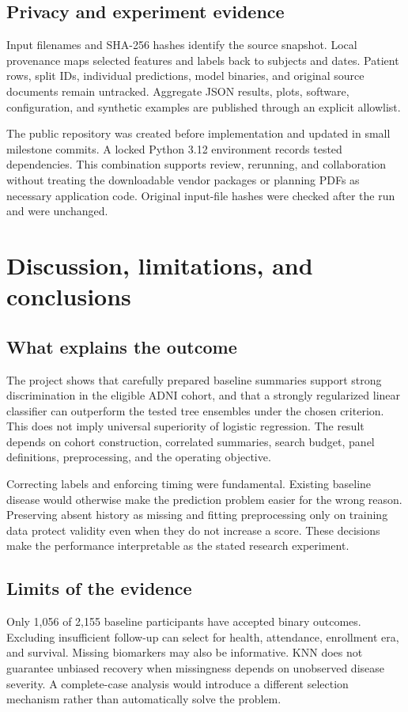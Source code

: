 \documentclass[11pt,a4paper]{article}
\begin{document}
\subsection{Privacy and experiment evidence}
Input filenames and SHA-256 hashes identify the source snapshot. Local provenance maps selected features and labels back to subjects and dates. Patient rows, split IDs, individual predictions, model binaries, and original source documents remain untracked. Aggregate JSON results, plots, software, configuration, and synthetic examples are published through an explicit allowlist.

The public repository was created before implementation and updated in small milestone commits. A locked Python 3.12 environment records tested dependencies. This combination supports review, rerunning, and collaboration without treating the downloadable vendor packages or planning PDFs as necessary application code. Original input-file hashes were checked after the run and were unchanged.

\clearpage
\section{Discussion, limitations, and conclusions}
\subsection{What explains the outcome}
The project shows that carefully prepared baseline summaries support strong discrimination in the eligible ADNI cohort, and that a strongly regularized linear classifier can outperform the tested tree ensembles under the chosen criterion. This does not imply universal superiority of logistic regression. The result depends on cohort construction, correlated summaries, search budget, panel definitions, preprocessing, and the operating objective.

Correcting labels and enforcing timing were fundamental. Existing baseline disease would otherwise make the prediction problem easier for the wrong reason. Preserving absent history as missing and fitting preprocessing only on training data protect validity even when they do not increase a score. These decisions make the performance interpretable as the stated research experiment.
\subsection{Limits of the evidence}
Only 1,056 of 2,155 baseline participants have accepted binary outcomes. Excluding insufficient follow-up can select for health, attendance, enrollment era, and survival. Missing biomarkers may also be informative. KNN does not guarantee unbiased recovery when missingness depends on unobserved disease severity. A complete-case analysis would introduce a different selection mechanism rather than automatically solve the problem.
\end{document}
